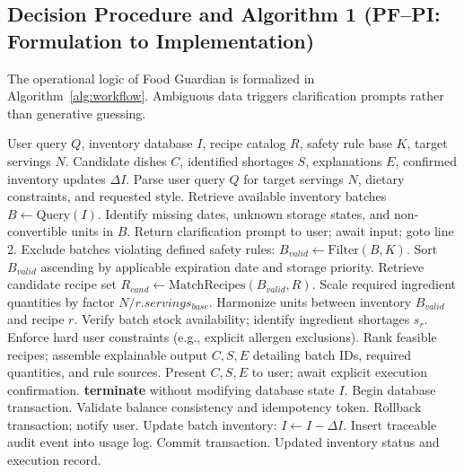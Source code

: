 \subsection{Decision Procedure and Algorithm 1 (PF--PI: Formulation to Implementation)}
The operational logic of Food Guardian is formalized in Algorithm~\ref{alg:workflow}. Ambiguous data triggers clarification prompts rather than generative guessing.

\begin{algorithm}[t]
\caption{Proposed Food Guardian Workflow}
\label{alg:workflow}
\begin{algorithmic}[1]
\REQUIRE User query $Q$, inventory database $I$, recipe catalog $R$, safety rule base $K$, target servings $N$.
\ENSURE Candidate dishes $C$, identified shortages $S$, explanations $E$, confirmed inventory updates $\Delta I$.
\STATE Parse user query $Q$ for target servings $N$, dietary constraints, and requested style.
\STATE Retrieve available inventory batches $B \leftarrow \text{Query}(I)$.
\STATE Identify missing dates, unknown storage states, and non-convertible units in $B$.
    \STATE Return clarification prompt to user; await input; goto line 2.
\ENDIF
\STATE Exclude batches violating defined safety rules: $B_{valid} \leftarrow \text{Filter}(B, K)$.
\STATE Sort $B_{valid}$ ascending by applicable expiration date and storage priority.
\STATE Retrieve candidate recipe set $R_{cand} \leftarrow \text{MatchRecipes}(B_{valid}, R)$.
    \STATE Scale required ingredient quantities by factor $N / r.servings_{base}$.
    \STATE Harmonize units between inventory $B_{valid}$ and recipe $r$.
    \STATE Verify batch stock availability; identify ingredient shortages $s_r$.
    \STATE Enforce hard user constraints (e.g., explicit allergen exclusions).
\ENDFOR
\STATE Rank feasible recipes; assemble explainable output $C, S, E$ detailing batch IDs, required quantities, and rule sources.
\STATE Present $C, S, E$ to user; await explicit execution confirmation.
    \STATE \textbf{terminate} without modifying database state $I$.
\ENDIF
\STATE Begin database transaction.
\STATE Validate balance consistency and idempotency token.
    \STATE Rollback transaction; notify user.
\ELSE
    \STATE Update batch inventory: $I \leftarrow I - \Delta I$.
    \STATE Insert traceable audit event into usage log.
    \STATE Commit transaction.
\ENDIF
\RETURN Updated inventory status and execution record.
\end{algorithmic}
\end{algorithm}
